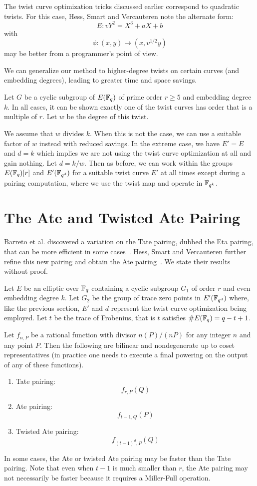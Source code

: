 The twist curve optimization tricks discussed earlier correspond to
quadratic twists.
For this case, Hess, Smart and Vercauteren note the alternate form:
\[ E : v Y^2 = X^3 + a X + b \]
with
\[ \phi : (x,y) \mapsto (x, v^{1/2} y) \]
may be better from a programmer's point of view.

We can generalize our method to higher-degree twists
on certain curves (and embedding degrees), leading to greater time and space
savings.

Let $G$ be a cyclic subgroup of $E(\mathbb{F}_q)$ of prime order $r \ge 5$
and embedding degree $k$.
In all cases, it can be shown exactly one of the twist curves
has order that is a multiple of $r$. Let $w$ be the degree of this twist.

We assume that $w$ divides $k$. When this is not the case,
we can use a suitable factor of $w$ instead with reduced savings.
In the extreme case, we have $E' = E$ and $d = k$ which implies we
are not using the twist curve optimization at all and gain nothing.
Let $d = k/w$. Then as before, we can work within the groups $E(\mathbb{F}_q)[r]$
and $E'(\mathbb{F}_{q^d})$ for a suitable twist curve $E'$ at all times except
during a pairing computation, where we use the twist map and
operate in $\mathbb{F}_{q^k}$.

\section {The Ate and Twisted Ate Pairing}

Barreto et al. discovered a variation on the Tate pairing,
dubbed the Eta pairing, that can be more efficient in some cases~\cite{etapairing}.
Hess, Smart and Vercauteren further refine this new pairing and obtain
the Ate pairing~\cite{hsv}. We state their results without proof.

Let $E$ be an elliptic over $\mathbb{F}_q$ containing a cyclic subgroup $G_1$ of
order $r$ and even embedding degree $k$. Let $G_2$ be the group of trace zero
points in $E'(\mathbb{F}_{q^d})$ where, like the previous section,
$E'$ and $d$ represent the twist curve optimization
being employed. Let $t$ be the trace of Frobenius, that
is $t$ satisfies $\#E(\mathbb{F}_q) = q-t+1$.

Let $f_{n,P}$ be a rational function with divisor $n(P)/(nP)$ for any integer
$n$ and any point $P$. Then the following are bilinear and nondegenerate
up to coset representatives (in practice one needs to execute a final powering
on the output of any of these functions).
\begin{enumerate}
\item
Tate pairing:
\[ f_{r,P}(Q) \]
\item
Ate pairing:
\[ f_{t-1,Q}(P) \]
\item
Twisted Ate pairing:
\[ f_{(t-1)^d,P}(Q) \]
\end{enumerate}

In some cases, the Ate or twisted Ate pairing may be faster than the Tate
pairing. Note that even when $t-1$ is much smaller than $r$,
the Ate pairing may not necessarily be faster because it
requires a Miller-Full operation.
